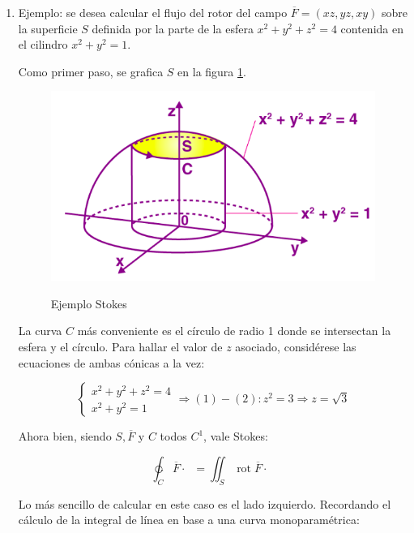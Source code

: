 \documentclass{article}
\begin{document}
\begin{enumerate}
\item Ejemplo: se desea calcular el flujo del rotor del campo $\overline{F} = (xz, yz, xy)$ sobre la superficie $S$ definida por la parte de la esfera $x^2 + y^2 + z^2 = 4$ contenida en el cilindro $x^2 + y^2 = 1$.

Como primer paso, se grafica $S$ en la figura \ref{fig:stokesex}.

\begin{figure}[ht]
\centering
\caption{Ejemplo Stokes}
\includegraphics[scale=0.7]{img/teoremas/ejemplo_stokes.png}
\label{fig:stokesex}
\end{figure}

La curva $C$ más conveniente es el círculo de radio 1 donde se intersectan la esfera y el círculo. Para hallar el valor de $z$ asociado, considérese las ecuaciones de ambas cónicas a la vez:

\begin{equation}
\left\{
\begin{array}{ll}
x^2 + y^2 + z^2 = 4 \\
x^2 + y^2 = 1
\end{array}
\right. \Rightarrow (1) - (2): z^2 = 3 \Rightarrow z = \sqrt{3}
\end{equation}

Ahora bien, siendo $S, \overline{F}$ y $C$ todos $C^1$, vale Stokes:

\begin{equation}
\ointctrclockwise_C \overline{F} \cdot \mathop{\overline{dC}} = \iint_S \mathop{rot}\overline{F} \cdot \mathop{\overline{dS}}
\end{equation} 

Lo más sencillo de calcular en este caso es el lado izquierdo. Recordando el cálculo de la integral de línea en base a una curva monoparamétrica:


\end{enumerate}
\end{document}
